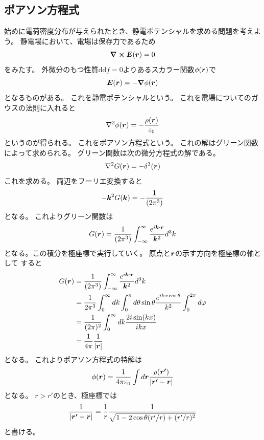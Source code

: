 \documentclass[../../master.tex]{subfiles}
\begin{document}
\subsection{ポアソン方程式}
始めに電荷密度分布が与えられたとき、静電ポテンシャルを求める問題を考えよう。
静電場において、電場は保存力であるため
\begin{equation}
	\curl \vb*{E}(\vb*{r}) = 0
\end{equation}
をみたす。
外微分のもつ性質\(\text{dd}f=0\)よりあるスカラー関数\(\phi(\vb*{r})\)で
\begin{equation}
	\vb*{E}(\vb*{r})= -\grad \phi(\vb*{r})
\end{equation}
となるものがある。
これを静電ポテンシャルという。
これを電場についてのガウスの法則に入れると
\begin{equation}
	\laplacian \phi(\vb*{r}) = -\frac{\rho(\vb*{r})}{\varepsilon_0}
\end{equation}
というのが得られる。
これをポアソン方程式という。
これの解はグリーン関数によって求められる。
グリーン関数は次の微分方程式の解である。
\begin{equation}
	\laplacian G(\vb*{r}) = -\delta^3(\vb*{r})
\end{equation}
これを求める。
両辺をフーリエ変換すると
\begin{equation}
	-\vb*{k}^2G(\vb*{k}) = -\frac{1}{(2\pi^3)}
\end{equation}
となる。
これよりグリーン関数は
\begin{equation}
	G(\vb*{r})=\frac{1}{(2\pi^3)}\int_{-\infty}^{\infty} \frac{e^{i\vb*{k}\cdot\vb*{r}}}{\vb*{k}^2}d^3k
\end{equation}
となる。この積分を極座標で実行していく。
原点と\(\vb*{r}\)の示す方向を極座標の軸として
すると
\begin{equation}\begin{aligned}[b]
    G(\vb*{r}) & =\frac{1}{(2\pi^3)}\int_{-\infty}^{\infty} \frac{e^{i\vb*{k}\cdot\vb*{r}}}{\vb*{k}^2}d^3k                                  \\
	           & =\frac{1}{2\pi^3}\int_{0}^{\infty}dk \int_{0}^{\pi}d\theta \sin\theta \frac{e^{ikx\cos\theta}}{k^2}\int_{0}^{2\pi}d\varphi \\
	           & =\frac{1}{(2\pi)^2}\int_{0}^{\infty}dk \frac{2i\sin(kx)}{ikx}                                                              \\
	           & =\frac{1}{4\pi}\frac{1}{\abs{\vb*{r}}}
\end{aligned}\end{equation}
となる。
これよりポアソン方程式の特解は
\begin{equation}
	\phi(\vb*{r}) = \frac{1}{4\pi\varepsilon_0}\int d\vb*{r}
	\frac{\rho(\vb*{r'})}{\abs{\vb*{r'}-\vb*{r}}}
\end{equation}
となる。
\(r>r'\)のとき、極座標では
\begin{equation}
	\frac{1}{\abs{\vb*{r'}-\vb*{r}}} = \frac{1}{r}\frac{1}{\sqrt{1-2\cos\theta(r'/r) + (r'/r)^2}}
\end{equation}
と書ける。
\end{document}
